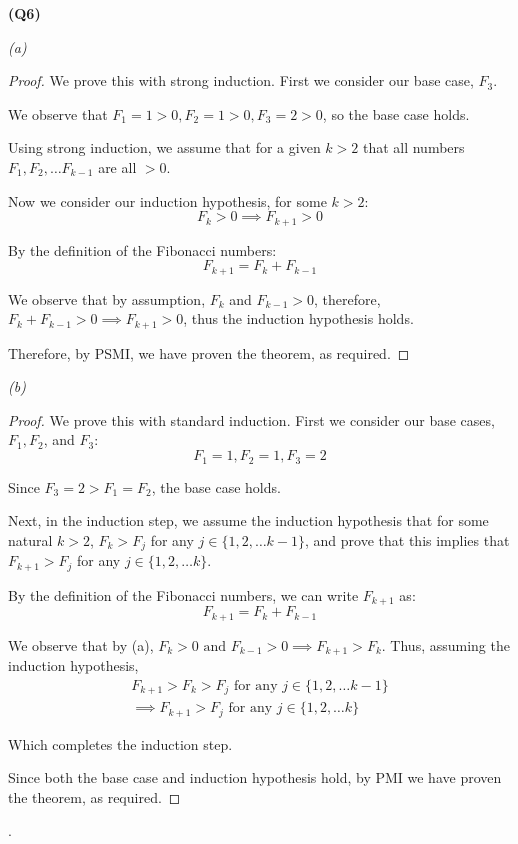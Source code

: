 \documentclass[12pt, a4paper]{article}
\begin{document}
\noindent\textbf{(Q6)}

\noindent\textit{(a)}

\begin{proof}
    We prove this with strong induction. First we consider our base case, $F_3$.

    We observe that $F_1 = 1 > 0, F_2 = 1 > 0, F_3 = 2 > 0$, so the base case holds.

    Using strong induction, we assume that for a given $k > 2$ that 
    all numbers $F_1, F_2, \ldots F_{k - 1}$ are all $> 0$.

    Now we consider our induction hypothesis, for some $k > 2$:
    \[
        F_k > 0 \implies F_{k + 1} > 0
    \]

    By the definition of the Fibonacci numbers:
    \[
        F_{k + 1} = F_k + F_{k - 1}
    \]

    We observe that by assumption, $F_k$ and $F_{k - 1} >0 $, therefore,
    $F_k + F_{k - 1} > 0 \implies F_{k + 1} > 0$, thus the induction hypothesis holds.

    Therefore, by PSMI, we have proven the theorem, as required.
\end{proof}

\noindent\textit{(b)}

\begin{proof}
    We prove this with standard induction. First we consider our base cases, $F_1, F_2$, and $F_3$:
    \[
        F_1 = 1, F_2 = 1, F_3 = 2
    \]

    Since $F_3 = 2 > F_1 = F_2$, the base case holds.

    Next, in the induction step, we assume the induction hypothesis that for some natural $k > 2$,
    $F_k > F_j$ for any $j \in \{1, 2, \ldots k - 1\}$, and prove that this implies
    that $F_{k + 1} > F_j$ for any $j \in \{1, 2, \ldots k\}$.

    By the definition of the Fibonacci numbers, we can write $F_{k + 1}$ as:
    \[
        F_{k + 1} = F_k + F_{k -1}
    \]

    We observe that by (a), $F_k > 0 \text{ and } F_{k - 1} > 0 \implies F_{k + 1} > F_k$. 
    Thus, assuming the induction hypothesis, 
    \begin{gather*}
        F_{k + 1} > F_k > F_j \text{ for any } j \in \{1, 2, \ldots k - 1\}\\
        \implies F_{k + 1} > F_j \text{ for any } j \in \{1, 2, \ldots k\}
    \end{gather*}

    Which completes the induction step.

    Since both the base case and induction hypothesis hold, by PMI we have proven the theorem,
    as required.
\end{proof}.
\end{document}
